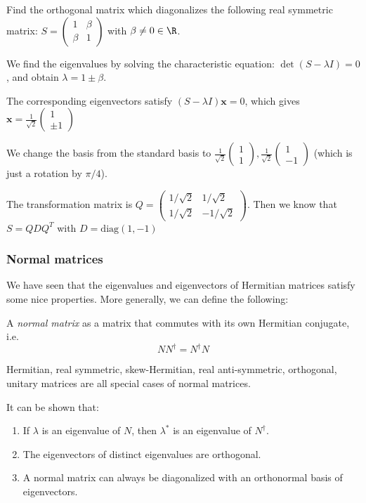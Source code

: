 \documentclass[a4paper]{article}
\begin{document}
\begin{eg}
  Find the orthogonal matrix which diagonalizes the following real symmetric matrix: $S =
  \begin{pmatrix}
    1 & \beta\\
    \beta & 1
  \end{pmatrix}$ with $\beta \not= 0 \in \R$.

  We find the eigenvalues by solving the characteristic equation: $\det(S - \lambda I) = 0$, and obtain $\lambda = 1\pm \beta$.

  The corresponding eigenvectors satisfy $(S - \lambda I)\mathbf{x} = 0$, which gives $\displaystyle \mathbf{x} = \frac{1}{\sqrt{2}}
  \begin{pmatrix}
    1\\
    \pm1
  \end{pmatrix}$

  We change the basis from the standard basis to $
  \displaystyle
  \frac{1}{\sqrt{2}}\begin{pmatrix}
    1\\1
  \end{pmatrix},
  \frac{1}{\sqrt{2}}
  \begin{pmatrix}
    1\\-1
  \end{pmatrix}$ (which is just a rotation by $\pi/4$).

  The transformation matrix is $
  Q = \begin{pmatrix}
    1/\sqrt{2} & 1/\sqrt{2}\\
    1/\sqrt{2} & -1/\sqrt{2}
  \end{pmatrix}$. Then we know that $S = QDQ^T$ with $D = \mathrm{diag}(1, -1)$
\end{eg}
\subsubsection{Normal matrices}
We have seen that the eigenvalues and eigenvectors of Hermitian matrices satisfy some nice properties. More generally, we can define the following:
\begin{defi}
  A \emph{normal matrix} as a matrix that commutes with its own Hermitian conjugate, i.e.
  \[
    NN^\dagger = N^\dagger N
  \]
\end{defi}
Hermitian, real symmetric, skew-Hermitian, real anti-symmetric, orthogonal, unitary matrices are all special cases of normal matrices.

It can be shown that:
\begin{prop}\leavevmode
  \begin{enumerate}
    \item If $\lambda$ is an eigenvalue of $N$, then $\lambda^*$ is an eigenvalue of $N^\dagger$.
    \item The eigenvectors of distinct eigenvalues are orthogonal.
    \item A normal matrix can always be diagonalized with an orthonormal basis of eigenvectors.
  \end{enumerate}
\end{prop}
\end{document}
